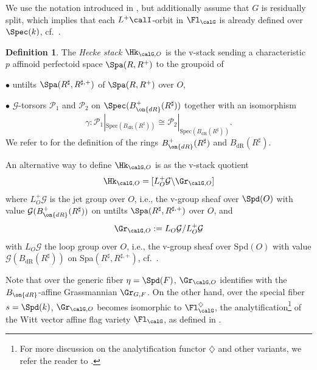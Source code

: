 \documentclass[10pt, reqno]{amsart}
\theoremstyle{plain}
\theoremstyle{definition}
\newtheorem{definition}[theorem]{Definition}
\numberwithin{equation}{section}
\begin{document}
	We use the notation introduced in , but additionally assume that $G$ is residually split, which implies that each $L^+\calI$-orbit in $\Fl_\calG$ is already defined over $\Spec(k)$, cf.\ .	
	\begin{definition}
		The \textit{Hecke stack} $\Hk_{\calG,O}$ is the v-stack sending a characteristic $p$ affinoid perfectoid space $\Spa(R,R^+)$ 
		to the groupoid of 
		
		$\bullet$
		untilts $\Spa(R^{\sharp},R^{\sharp,+})$  of  $\Spa(R,R^+)$ over $O$,
		
		$\bullet$
		$\mathcal{G}$-torsors $\mathcal{P}_1$ and $\mathcal{P}_2$ on $\Spec(B_{\on{dR}}^+(R^{\sharp}))$ together with an isomorphism  
		\begin{equation}
			\gamma: 
			\mathcal{P}_1|_{\text{Spec}(B_{\text{dR}}(R^{\sharp}))} \cong 
			\mathcal{P}_2|_{\text{Spec}(B_{\text{dR}}(R^{\sharp}))}.
		\end{equation}
		We refer to \cite[Section 20.3]{SW20} for the definition of the rings $B_{\on{dR}}^+(R^\sharp)$ and $B_{\mathrm{dR}}(R^\sharp)$.
	\end{definition}
	
	
	An alternative way to define $\Hk_{\calG,O}$ is as the v-stack quotient
	\begin{equation}
		\Hk_{\calG,O} = [L_{O}^+\mathcal{G} \backslash \Gr_{\calG,O}]
	\end{equation}
	where $L_{O}^+\mathcal{G}$ is the jet group over $O$, i.e., the v-group sheaf over $\Spd(O)$ with value
	$\mathcal{G}(B_{\on{dR}}^+(R^{\sharp}))$
	on untilts $\Spa(R^{\sharp},R^{\sharp,+})$ over $O$, and 
	\begin{equation}
		\Gr_{\calG,O} := L_{O}\mathcal{G} /L_{O}^+\mathcal{G}
	\end{equation}
	with $L_{O}\mathcal{G}$ the loop group over $O$, i.e., the v-group sheaf over Spd$(O)$ with value $\mathcal{G}(B_{\text{dR}}(R^{\sharp}))$ on 
	Spa$(R^{\sharp},R^{\sharp,+})$, cf.\  \cite[Lemma 4.10]{AGLR22}. 
	
	Note that over the generic fiber  $\eta = \Spd(F)$, $\Gr_{\calG,O}$ identifies with the $B_{\on{dR}}$-affine Grassmannian $\Gr_{G,F}$. On the other hand, over the special fiber $s=\Spd(k)$, $\Gr_{\calG,O}$  becomes isomorphic to $\Fl_{\calG}^\diamondsuit$, the analytification\footnote{For more discussion on the analytification functor $\diamondsuit$ and other variants, we refer the reader to \cite[Subsection 2.2]{AGLR22}.} of the Witt vector affine flag variety $\Fl_\calG$, as defined in \cite[Section 27]{Sch17}. 
	
\end{document}
